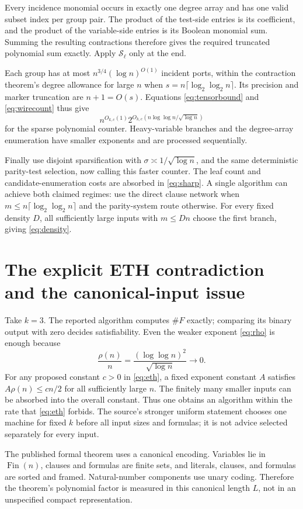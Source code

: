 \documentclass[11pt,a4paper]{article}
\numberwithin{equation}{section}
\theoremstyle{definition}
\theoremstyle{remark}
\begin{document}
Every incidence monomial occurs in exactly one degree array and has one valid
subset index per group pair. The product of the test-side entries is its
coefficient, and the product of the variable-side entries is its Boolean
monomial sum. Summing the resulting contractions therefore gives the required
truncated polynomial sum exactly. Apply $\mathcal S_\ell$ only at the end.

Each group has at most $n^{3/4}(\log n)^{O(1)}$ incident ports, within the
contraction theorem's degree allowance for large $n$ when
$s=n\lceil\log_2\log_2n\rceil$. Its precision and marker truncation are
$n+1=O(s)$. Equations \eqref{eq:tensorbound} and \eqref{eq:wirecount} thus give
\[
 n^{O_{k,c}(1)}2^{O_{k,c}(n\log\log n/\sqrt{\log n})}
\]
for the sparse polynomial counter. Heavy-variable branches and the degree-array
enumeration have smaller exponents and are processed sequentially.

Finally use disjoint sparsification with
$\sigma\asymp1/\sqrt{\log n}$, and the same deterministic parity-test selection,
now calling this faster counter. The leaf count and candidate-enumeration
costs are absorbed in \eqref{eq:sharp}. A single algorithm can achieve both
claimed regimes: use the direct clause network when
$m\le n\lceil\log_2\log_2n\rceil$ and the parity-system route otherwise.
For every fixed density $D$, all sufficiently large inputs with $m\le Dn$
choose the first branch, giving \eqref{eq:density}.

\section{The explicit ETH contradiction and the canonical-input issue}
\label{sec:eth-consequence}
Take $k=3$. The reported algorithm computes $\#F$ exactly; comparing its
binary output with zero decides satisfiability. Even the weaker exponent
\eqref{eq:rho} is enough because
\[
 \frac{\rho(n)}n=\frac{(\log\log n)^2}{\sqrt{\log n}}\longrightarrow0.
\]
For any proposed constant $c>0$ in \eqref{eq:eth}, a fixed exponent constant
$A$ satisfies $A\rho(n)\le cn/2$ for all sufficiently large $n$.
The finitely many smaller inputs can be absorbed into the overall constant.
Thus one obtains an algorithm within the rate that \eqref{eq:eth} forbids.
The source's stronger uniform statement chooses one machine for fixed $k$
before all input sizes and formulas; it is not advice selected separately
for every input.

The published formal theorem uses a canonical encoding. Variables lie in
$\operatorname{Fin}(n)$, clauses and formulas are finite sets, and literals,
clauses, and formulas are sorted and framed. Natural-number components use
unary coding. Therefore the theorem's polynomial factor is measured in this
canonical length $L$, not in an unspecified compact representation.
\end{document}
